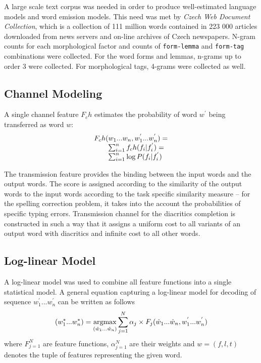 \documentclass[11pt]{article}
\newcommand{\argmax}{\operatornamewithlimits{argmax}}
\begin{document}
A large scale text corpus was needed in order to produce well-estimated language models and word emission models.
This need was met by \emph{Czech Web Document Collection}\cite{marek:2007}, which is a collection of 111 million words contained in 223 000 articles downloaded
from news servers and on-line archives of Czech newspapers. N-gram counts for each morphological factor and 
counts of \texttt{form-lemma} and \texttt{form-tag} combinations were collected.
For the word forms and lemmas, n-grams up to order 3 were collected. For morphological tags, 4-grams were collected as well.

\subsection{Channel Modeling}
A single channel feature $F_ch$ estimates the probability of word $w^{'}$ being
transferred as word $w$:
\[
    \begin{array}{rcl}
        \multicolumn{3}{l}{F_ch(w_1 ... w_n, w_1^{'} ... w_n^{'}) =}\\
        &	& \sum_{i = 1}^n f_ch(f_i | f_i^{'}) = \\
        &	& \sum_{i = 1}^n \log P(f_i | f_i^{'})
    \end{array}
\]

The transmission feature provides the binding between the input words
and the output words. The score is assigned according to the
similarity of the output words to the input words according to the task
specific similarity measure -- for the spelling correction
problem, it takes into the account the probabilities of specific
typing errors. Transmission channel for the diacritics completion is
constructed in such a way that it assigns a uniform cost to all variants
of an output word with diacritics and infinite cost to all other
words.

\subsection{Log-linear Model}
A log-linear model was used to combine all feature functions into a single
statistical model. A general
equation capturing a log-linear model for decoding of sequence $w_1^{'} ...
w_n^{'}$ can be written as follows
\[
    (w^*_1 ... w^*_n) = \displaystyle\argmax_{(\hat{w}_1 ... \hat{w}_n)}\sum_{j=1}^N \alpha_j \times 
F_j(\hat{w}_1 ... \hat{w}_n, w_1^{'} ... w_n^{'})
\]
%
where $F_{j=1}^N$ are feature functions, $\alpha_{j=1}^N$ are their weights and
$w = (f, l, t)$ denotes the tuple of features representing the given word.
\end{document}

